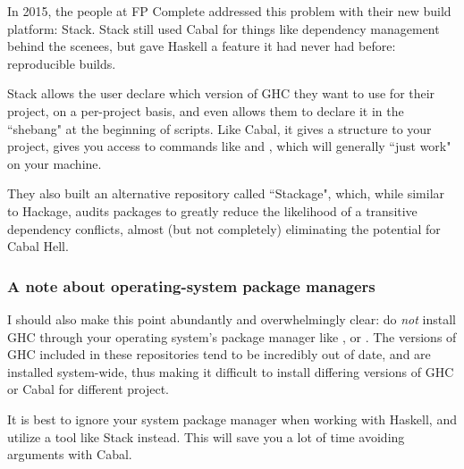 In 2015, the people at FP Complete addressed this problem with their new build platform: Stack.  Stack still used Cabal for things like dependency management behind the scenees, but gave Haskell a feature it had never had before: reproducible builds. 

Stack allows the user declare which version of GHC they want to use for their project, on a per-project basis, and even allows them to declare it in the ``shebang" at the beginning of scripts.  Like Cabal, it gives a structure to your project, gives you access to commands like  and , which will generally ``just work" on your machine. 

They also built an alternative repository called ``Stackage", which, while similar to Hackage, audits packages to greatly reduce the likelihood of a transitive dependency conflicts, almost (but not completely) eliminating the potential for Cabal Hell. 

\subsubsection{A note about operating-system package managers}
I should also make this point abundantly and overwhelmingly clear: do \textit{not} install GHC through your operating system's package manager like ,  or . The versions of GHC included in these repositories tend to be incredibly out of date, and are installed system-wide, thus making it difficult to install differing versions of GHC or Cabal for different project. 

It is best to ignore your system package manager when working with Haskell, and utilize a tool like Stack instead.  This will save you a lot of time avoiding arguments with Cabal. 



%
%


